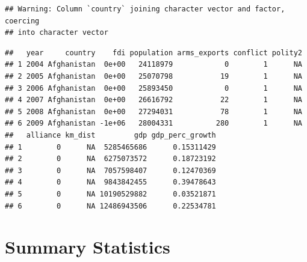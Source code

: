 \documentclass[12pt,]{article}
\newenvironment{Shaded}{\begin{snugshade}}{\end{snugshade}}
\newcommand{\CharTok}[1]{\textcolor[rgb]{0.31,0.60,0.02}{#1}}
\newcommand{\CommentTok}[1]{\textcolor[rgb]{0.56,0.35,0.01}{\textit{#1}}}
\newcommand{\DataTypeTok}[1]{\textcolor[rgb]{0.13,0.29,0.53}{#1}}
\newcommand{\DecValTok}[1]{\textcolor[rgb]{0.00,0.00,0.81}{#1}}
\newcommand{\KeywordTok}[1]{\textcolor[rgb]{0.13,0.29,0.53}{\textbf{#1}}}
\newcommand{\NormalTok}[1]{#1}
\newcommand{\OperatorTok}[1]{\textcolor[rgb]{0.81,0.36,0.00}{\textbf{#1}}}
\newcommand{\OtherTok}[1]{\textcolor[rgb]{0.56,0.35,0.01}{#1}}
\newcommand{\StringTok}[1]{\textcolor[rgb]{0.31,0.60,0.02}{#1}}
\begin{document}
\begin{verbatim}
## Warning: Column `country` joining character vector and factor, coercing
## into character vector
\end{verbatim}

\begin{Shaded}
\end{Shaded}

\begin{verbatim}
##   year     country    fdi population arms_exports conflict polity2
## 1 2004 Afghanistan  0e+00   24118979            0        1      NA
## 2 2005 Afghanistan  0e+00   25070798           19        1      NA
## 3 2006 Afghanistan  0e+00   25893450            0        1      NA
## 4 2007 Afghanistan  0e+00   26616792           22        1      NA
## 5 2008 Afghanistan  0e+00   27294031           78        1      NA
## 6 2009 Afghanistan -1e+06   28004331          280        1      NA
##   alliance km_dist         gdp gdp_perc_growth
## 1        0      NA  5285465686      0.15311429
## 2        0      NA  6275073572      0.18723192
## 3        0      NA  7057598407      0.12470369
## 4        0      NA  9843842455      0.39478643
## 5        0      NA 10190529882      0.03521871
## 6        0      NA 12486943506      0.22534781
\end{verbatim}

\hypertarget{summary-statistics}{%
\section{Summary Statistics}\label{summary-statistics}}
\end{document}
